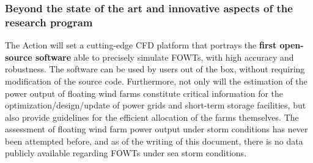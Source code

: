 


\vspace{-2ex}\subsubsection*{Beyond the state of the art and innovative aspects of the research program}\vspace{-1ex}

The Action will set a cutting-edge CFD platform that portrays the \textbf{first open-source software} able to precisely simulate FOWTs, with high accuracy and robustness. The software can be used by users out of the box, without requiring modification of the source code. Furthermore, not only will the estimation of the power output of floating wind farms constitute critical information for the optimization/design/update of power grids and short-term storage facilities, but also provide guidelines for the efficient allocation of the farms themselves. The assessment of floating wind farm power output under storm conditions has never been attempted before, and as of the writing of this document, there is no data publicly available regarding FOWTs under sea storm conditions.\vspace{-2ex}

